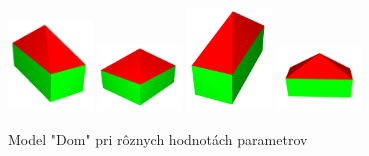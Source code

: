 \begin{figure}[H]
	\centering
	\includegraphics[width=0.20\textwidth]{obrazky-figures/Examples/home.png}
	\includegraphics[width=0.20\textwidth]{obrazky-figures/Examples/home1.png}
	\includegraphics[width=0.20\textwidth]{obrazky-figures/Examples/home2.png}
	\includegraphics[width=0.20\textwidth]{obrazky-figures/Examples/home3.png}
	\caption{Model "Dom" pri rôznych hodnotách parametrov}
	\label{fig:homeModel}
\end{figure}

